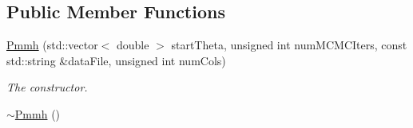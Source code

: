 \subsection*{Public Member Functions}
\begin{DoxyCompactItemize}
\item 
\hyperlink{classPmmh_ad44ef54e134729330d0415461e002cfd}{Pmmh} (std\+::vector$<$ double $>$ start\+Theta, unsigned int num\+M\+C\+M\+C\+Iters, const std\+::string \&data\+File, unsigned int num\+Cols)
\begin{DoxyCompactList}\small\item\em The constructor. \end{DoxyCompactList}\item 
\hyperlink{classPmmh_a52b058761ac6ede77eb3d8c0099e0d93}{$\sim$\+Pmmh} ()\hypertarget{classPmmh_a52b058761ac6ede77eb3d8c0099e0d93}{}\label{classPmmh_a52b058761ac6ede77eb3d8c0099e0d93}


\end{DoxyCompactItemize}
